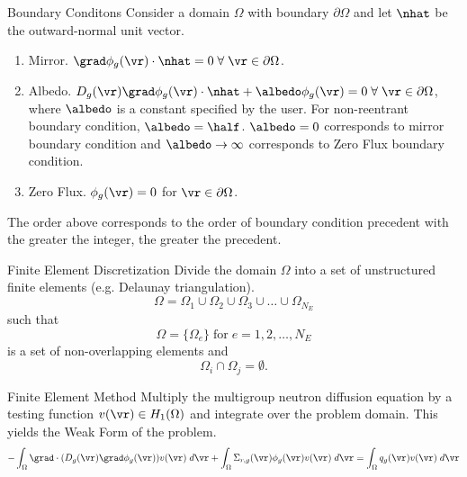 \begin{frame}{Boundary Conditons}
  Consider a domain $\Omega$ with boundary $\partial \Omega$ and let $\nhat$ be
  the outward-normal unit vector.

  \begin{enumerate}
    \item Mirror. $\grad \phi_g(\vr) \cdot \nhat = 0 \; \forall \; 
      \vr \in \partial \Omega$.
    \item Albedo. $D_g(\vr) \grad \phi_g(\vr) \cdot \nhat + \albedo \phi_g(\vr)
      = 0 \; \forall \; \vr \in \partial \Omega$, where $\albedo$ is a constant
      specified by the user. For non-reentrant boundary condition, $\albedo =
      \half$. $\albedo = 0$ corresponds to mirror boundary condition and
      $\albedo \rightarrow \infty$ corresponds to Zero Flux boundary condition.
    \item Zero Flux. $\phi_g(\vr) = 0$ for $\vr \in \partial \Omega$.
  \end{enumerate}

  The order above corresponds to the order of boundary condition precedent with 
  the greater the integer, the greater the precedent.
\end{frame}

\begin{frame}{Finite Element Discretization}
  Divide the domain $\Omega$ into a set of unstructured finite elements 
  (e.g. Delaunay triangulation).
  \begin{equation}
    \label{eq:set_of_elements}
    \Omega = \Omega_1 \cup \Omega_2 \cup \Omega_3 \cup \ldots \cup
      \Omega_{N_E} 
  \end{equation}
  such that
  \begin{equation}
    \Omega = \{\Omega_e\} \; \text{for} \; e = 1,2,\ldots,N_E
  \end{equation}
  is a set of non-overlapping elements and
  \begin{equation}
    \Omega_i \cap \Omega_j = \emptyset.
  \end{equation}
\end{frame}

\begin{frame}{Finite Element Method}
  Multiply the multigroup neutron diffusion equation by a testing function
  $v(\vr) \in H_1(\Omega)$ and integrate over the problem domain. This yields
  the Weak Form of the problem.
  \begin{equation}
    \label{eq:fem_weak_form}
    - \int_{\Omega} \grad \cdot (D_g(\vr) \grad \phi_g(\vr)) v(\vr) \; d\vr
      + \int_{\Omega} \Sigma_{r,g}(\vr) \phi_g(\vr) v(\vr) \;d\vr=
      \int_{\Omega} q_g(\vr) v(\vr) \;d\vr
  \end{equation}
\end{frame}

